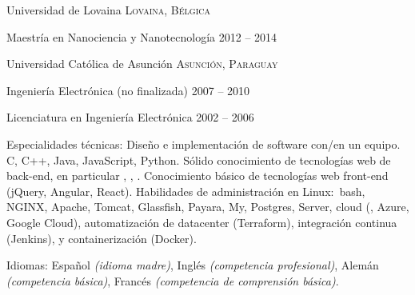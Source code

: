 \documentclass[10pt,a4paper]{article} %
\begin{document}

\headedsection %
{Universidad de Lovaina}
{\textsc{Lovaina, Bélgica}} {

\headedsubsection %
{Maestría en Nanociencia y Nanotecnología}
{2012 -- 2014}
{}
}


\headedsection %
{Universidad Católica de Asunción}
{\textsc{Asunción, Paraguay}} {

\headedsubsection %
{Ingeniería Electrónica \textnormal{(no finalizada)}}
{2007 -- 2010} {}

\headedsubsection %
{Licenciatura en Ingeniería Electrónica}
{2002 -- 2006} {}
}

\spacedhrule{0.5em}{-0.4em} %



\inlineheadsection %
{Especialidades técnicas:}
{Diseño e implementación de software con/en un equipo. C, C++, Java, JavaScript, Python. Sólido conocimiento de tecnologías web de back-end, en particular , , . Conocimiento básico de tecnologías web front-end (jQuery, Angular, React). Habilidades de administración en Linux:\ bash, NGINX, Apache, Tomcat, Glassfish, Payara, My, Postgres, Server, cloud (, Azure, Google Cloud), automatización de datacenter (Terraform), integración continua (Jenkins), y containerización (Docker).}


\inlineheadsection %
{Idiomas:}
{Español \textit{(idioma madre)}, Inglés \textit{(competencia profesional)}, Alemán \textit{(competencia básica)}, Francés \textit{(competencia de comprensión básica)}.}

\end{document}

